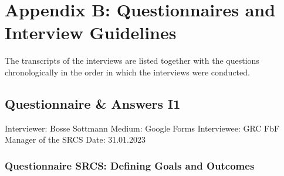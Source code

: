 
\chapter{Appendix B: Questionnaires and Interview Guidelines} %

\label{AppendixB} %

The transcripts of the interviews are listed together with the questions chronologically in the order in which the interviews were conducted.

\section{Questionnaire \& Answers I1}

Interviewer: Bosse Sottmann\newline
Medium: Google Forms\newline
Interviewee: GRC FbF Manager of the SRCS \newline
Date: 31.01.2023

\subsection*{Questionnaire SRCS: Defining Goals and Outcomes}

